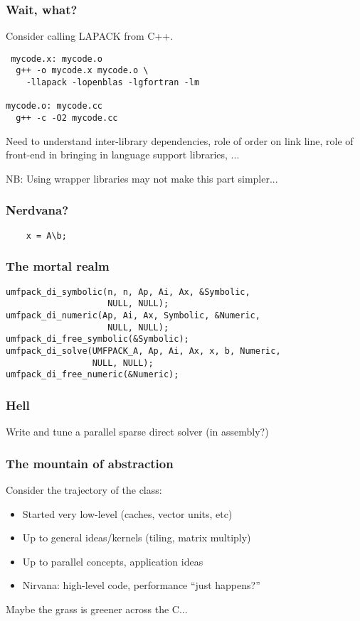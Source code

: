 \documentclass{beamer}
\begin{document}
\begin{frame}[fragile]
  \frametitle{Wait, what?}

  Consider calling LAPACK from C++.
\begin{lstlisting}
 mycode.x: mycode.o
  g++ -o mycode.x mycode.o \
    -llapack -lopenblas -lgfortran -lm
  
mycode.o: mycode.cc
  g++ -c -O2 mycode.cc
\end{lstlisting}
  Need to understand inter-library dependencies, role of order on link
  line, role of front-end in bringing in language support libraries, ...

  \vspace{2mm}
  NB: Using wrapper libraries may not make this part simpler...
\end{frame}


\begin{frame}[fragile]
  \frametitle{Nerdvana?}

  \begin{lstlisting}
    x = A\b;
  \end{lstlisting}
\end{frame}


\begin{frame}[fragile]
  \frametitle{The mortal realm}

\begin{lstlisting}
umfpack_di_symbolic(n, n, Ap, Ai, Ax, &Symbolic,
                    NULL, NULL);
umfpack_di_numeric(Ap, Ai, Ax, Symbolic, &Numeric,
                    NULL, NULL);
umfpack_di_free_symbolic(&Symbolic);
umfpack_di_solve(UMFPACK_A, Ap, Ai, Ax, x, b, Numeric,
                 NULL, NULL);
umfpack_di_free_numeric(&Numeric);    
\end{lstlisting}
\end{frame}


\begin{frame}
  \frametitle{Hell}
  
  Write and tune a parallel sparse direct solver (in assembly?)
\end{frame}


\begin{frame}
  \frametitle{The mountain of abstraction}

  Consider the trajectory of the class:
  \begin{itemize}
  \item Started very low-level (caches, vector units, etc)
  \item Up to general ideas/kernels (tiling, matrix multiply)
  \item Up to parallel concepts, application ideas
  \item Nirvana: high-level code, performance ``just happens?''
  \end{itemize}
  Maybe the grass is greener across the C...
\end{frame}
\end{document}
